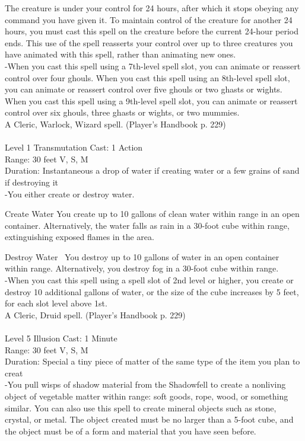 \documentclass[10pt,twocolumn]{report}
\begin{document}
The creature is under your control for 24 hours, after which it stops obeying any command you have given it. To maintain control of the creature for another 24 hours, you must cast this spell on the creature before the current 24-hour period ends. This use of the spell reasserts your control over up to three creatures you have animated with this spell, rather than animating new ones.\\
-When you cast this spell using a 7th-level spell slot, you can animate or reassert control over four ghouls. 
When you cast this spell using an 8th-level spell slot, you can animate or reassert control over five ghouls or two ghasts or wights. 
When you cast this spell using a 9th-level spell slot, you can animate or reassert control over six ghouls, three ghasts or wights, or two mummies.\\
A Cleric, Warlock, Wizard spell. (Player's Handbook p. 229) \\


 \\
Level 1 \quad Transmutation \quad Cast: 1 Action\\
Range: 30 feet \quad V, S, M \\
Duration: Instantaneous \quad a drop of water if creating water or a few grains of sand if destroying it\\
-You either create or destroy water. 

Create Water 
You create up to 10 gallons of clean water within range in an open container. Alternatively, the water falls as rain in a 30-foot cube within range, extinguishing exposed flames in the area. 

Destroy Water 
You destroy up to 10 gallons of water in an open container within range. Alternatively, you destroy fog in a 30-foot cube within range.\\
-When you cast this spell using a spell slot of 2nd level or higher, you create or destroy 10 additional gallons of water, or the size of the cube increases by 5 feet, for each slot level above 1st.\\
A Cleric, Druid spell. (Player's Handbook p. 229) \\


 \\
Level 5 \quad Illusion \quad Cast: 1 Minute\\
Range: 30 feet \quad V, S, M \\
Duration: Special \quad a tiny piece of matter of the same type of the item you plan to creat\\
-You pull wisps of shadow material from the Shadowfell to create a nonliving object of vegetable matter within range: soft goods, rope, wood, or something similar. You can also use this spell to create mineral objects such as stone, crystal, or metal. The object created must be no larger than a 5-foot cube, and the object must be of a form and material that you have seen before. 
\end{document}
